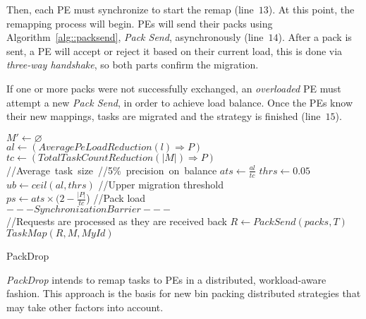 Then, each PE must synchronize to start the remap (line~$13$). 
At this point, the remapping process will begin.
PEs will send their packs using Algorithm~\ref{alg::packsend}, \textit{Pack Send}, asynchronously (line~$14$).
After a pack is sent, a PE will accept or reject it based on their current load, this is done via \textit{three-way handshake}, so both parts confirm the migration.

If one or more packs were not successfully exchanged, an \textit{overloaded} PE must attempt a new \textit{Pack Send}, in order to achieve load balance.
Once the PEs know their new mappings, tasks are migrated and the strategy is finished (line~$15$). 

\begin{algorithm}
	\DontPrintSemicolon
    $  M' \gets \varnothing$\\
    $al \gets (AveragePeLoadReduction(l)\Rightarrow  P)$ \\
    $tc \gets (TotalTaskCountReduction(|  M|)\Rightarrow  P)$\\
    //Average~task~size~\quad//5\%~precision~on~balance\qquad
    $ats\gets \frac{al}{tc}$ \qquad\qquad $thrs \gets 0.05$\\
    $ub \gets ceil(al,thrs)$ \qquad //Upper migration threshold\\
    $ps \gets ats\times (2-\frac{|  P|}{tc}$) \qquad\qquad //Pack load\\
    $---Synchronization Barrier---$\\
    //Requests are processed as they are received back
    $R \gets PackSend(packs, T)$\\
    $TaskMap(R,   M, MyId)$
    \caption{PackDrop}
    \label{algo:packdrop}    
\end{algorithm}

\textit{PackDrop} intends to remap tasks to PEs in a distributed, workload-aware fashion.
This approach is the basis for new bin packing distributed strategies that may take other factors into account.

